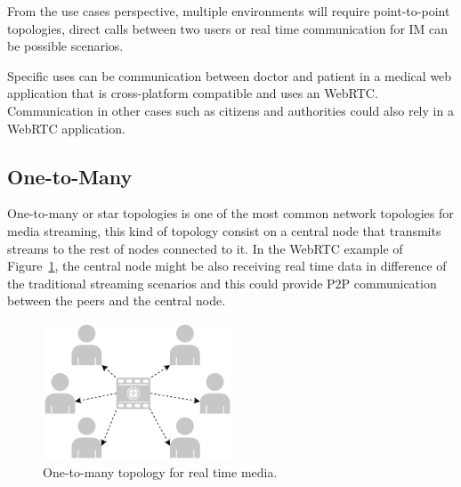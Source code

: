 From the use cases perspective, multiple environments will require point-to-point topologies, direct calls between two users or real time communication for IM can be possible scenarios.

Specific uses can be communication between doctor and patient in a medical web application that is cross-platform compatible and uses an WebRTC. Communication in other cases such as citizens and authorities could also rely in a WebRTC application.
 
%
%

\subsection{One-to-Many}

One-to-many or star topologies is one of the most common network topologies for media streaming, this kind of topology consist on a central node that transmits streams to the rest of nodes connected to it. In the WebRTC example of Figure~\ref{fig:starExample}, the central node might be also receiving real time data in difference of the traditional streaming scenarios and this could provide P2P communication between the peers and the central node.

 \begin{figure}[h]
  \centering
    \includegraphics[width=0.5\textwidth]{./figures/star.pdf}
      \caption[One-to-many topology for real time media]{One-to-many topology for real time media.}
	\label{fig:starExample}
\end{figure}

